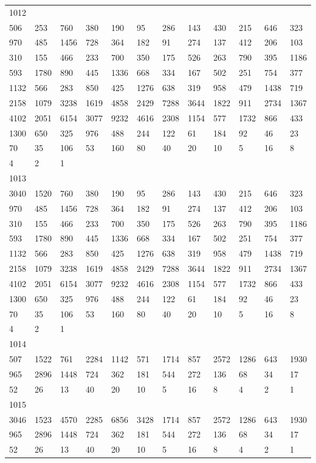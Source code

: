 \begin{longtable}{llllllllllll}
1012&&&&&&&&&&&\\
506& 253& 760& 380& 190& 95& 286& 143& 430& 215& 646& 323\\
970& 485& 1456& 728& 364& 182& 91& 274& 137& 412& 206& 103\\
310& 155& 466& 233& 700& 350& 175& 526& 263& 790& 395& 1186\\
593& 1780& 890& 445& 1336& 668& 334& 167& 502& 251& 754& 377\\
1132& 566& 283& 850& 425& 1276& 638& 319& 958& 479& 1438& 719\\
2158& 1079& 3238& 1619& 4858& 2429& 7288& 3644& 1822& 911& 2734& 1367\\
4102& 2051& 6154& 3077& 9232& 4616& 2308& 1154& 577& 1732& 866& 433\\
1300& 650& 325& 976& 488& 244& 122& 61& 184& 92& 46& 23\\
70& 35& 106& 53& 160& 80& 40& 20& 10& 5& 16& 8\\
4& 2& 1& \\

1013&&&&&&&&&&&\\
3040& 1520& 760& 380& 190& 95& 286& 143& 430& 215& 646& 323\\
970& 485& 1456& 728& 364& 182& 91& 274& 137& 412& 206& 103\\
310& 155& 466& 233& 700& 350& 175& 526& 263& 790& 395& 1186\\
593& 1780& 890& 445& 1336& 668& 334& 167& 502& 251& 754& 377\\
1132& 566& 283& 850& 425& 1276& 638& 319& 958& 479& 1438& 719\\
2158& 1079& 3238& 1619& 4858& 2429& 7288& 3644& 1822& 911& 2734& 1367\\
4102& 2051& 6154& 3077& 9232& 4616& 2308& 1154& 577& 1732& 866& 433\\
1300& 650& 325& 976& 488& 244& 122& 61& 184& 92& 46& 23\\
70& 35& 106& 53& 160& 80& 40& 20& 10& 5& 16& 8\\
4& 2& 1& \\

1014&&&&&&&&&&&\\
507& 1522& 761& 2284& 1142& 571& 1714& 857& 2572& 1286& 643& 1930\\
965& 2896& 1448& 724& 362& 181& 544& 272& 136& 68& 34& 17\\
52& 26& 13& 40& 20& 10& 5& 16& 8& 4& 2& 1\\

1015&&&&&&&&&&&\\
3046& 1523& 4570& 2285& 6856& 3428& 1714& 857& 2572& 1286& 643& 1930\\
965& 2896& 1448& 724& 362& 181& 544& 272& 136& 68& 34& 17\\
52& 26& 13& 40& 20& 10& 5& 16& 8& 4& 2& 1\\


\end{longtable}

